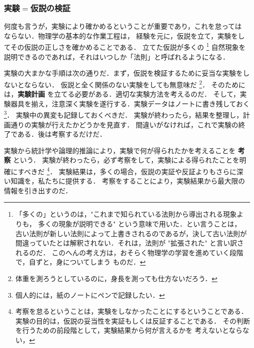         \subsubsection{実験$=$仮説の検証}
            何度も言うが，実験により確かめるということが重要であり，これを怠っては
            ならない．物理学の基本的な作業工程は，
            経験を元に，仮説を立て，実験をしてその仮説の正しさを確かめることである．
            立てた仮説が多くの
                \footnote{
                    「多くの」というのは，"これまで知られている法則から導出される現象よりも，
                     多くの現象が説明できる" という意味で用いた．とい言うことは，
                     古い法則が新しい法則によって上書きされるのであるが，決して古い法則が
                     間違っていたとは解釈されない．それは，法則が "拡張された" と言い訳されるのだ．
                     このへんの考え方は，おそらく物理学の学習を進めていく段階で，自ずと，身についてしまう
                     ものだ．
                }
            自然現象を説明できるのであれば，それはいつしか「法則」と呼ばれるようになる．

            実験の大まかな手順は次の通りだ．まず，仮説を検証するために妥当な実験をしないとならない．
            仮説と全く関係のない実験をしても無意味だ
                \footnote{
                    体重を測ろうとしているのに，身長を測っても仕方ないだろう．
                }．
            そのためには，\textbf{実験計画} を立てる必要がある．適切な実験方法を考えるのだ．
            そして，実験器具を揃え，注意深く実験を遂行する．実験データはノートに書き残しておく
                \footnote{
                    個人的には，紙のノートにペンで記録したい．
                }．
            実験中の異変も記録しておくべきだ．
            実験が終わったら，結果を整理し，計画通りの実験が行えたかどうかを見直す．
            間違いがなければ，これで実験の終了である．後は考察するだけだ．

            実験から統計学や論理的推論により，実験で何が得られたかを考えることを \textbf{考察} という．
            実験が終わったら，必ず考察をして，実験による得られたことを明確にすべきだ
                \footnote{
                    考察を怠るということは，実験をしなかったことにするということである．
                    実験の目的は，仮説の妥当性を実証もしくは反証することである．
                    その判断を行うための前段階として，実験結果から何が言えるかを
                    考えないとならない，
                }．
            実験結果は，多くの場合，仮説の実証や反証よりもさらに深い知識を，私たちに提供する．
            考察をすることにより，実験結果から最大限の情報を引き出すのだ．

